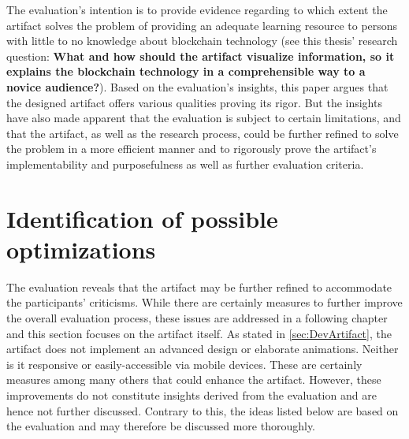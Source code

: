 The evaluation's intention is to provide evidence regarding to which extent the artifact solves the problem of providing an adequate learning resource to persons with little to no knowledge about blockchain technology (see this thesis' research question: \textbf{What and how should the artifact visualize information, so it explains the blockchain technology in a comprehensible way to a novice audience?}).
Based on the evaluation's insights, this paper argues that the designed artifact offers various qualities proving its rigor. But the insights have also made apparent that the evaluation is subject to certain limitations, and that the artifact, as well as the research process, could be further refined to solve the problem in a more efficient manner and to rigorously prove the artifact's implementability and purposefulness as well as further evaluation criteria. 

\section{Identification of possible optimizations} \label{sec:Optimizations}
The evaluation reveals that the artifact may be further refined to accommodate the participants' criticisms. While there are certainly measures to further improve the overall evaluation process, these issues are addressed in a following chapter and this section focuses on the artifact itself. As stated in \ref{sec:DevArtifact}, the artifact does not implement an advanced design or elaborate animations. Neither is it responsive or easily-accessible via mobile devices. These are certainly measures among many others that could enhance the artifact. However, these improvements do not constitute insights derived from the evaluation and are hence not further discussed. Contrary to this, the ideas listed below are based on the evaluation and may therefore be discussed more thoroughly.


